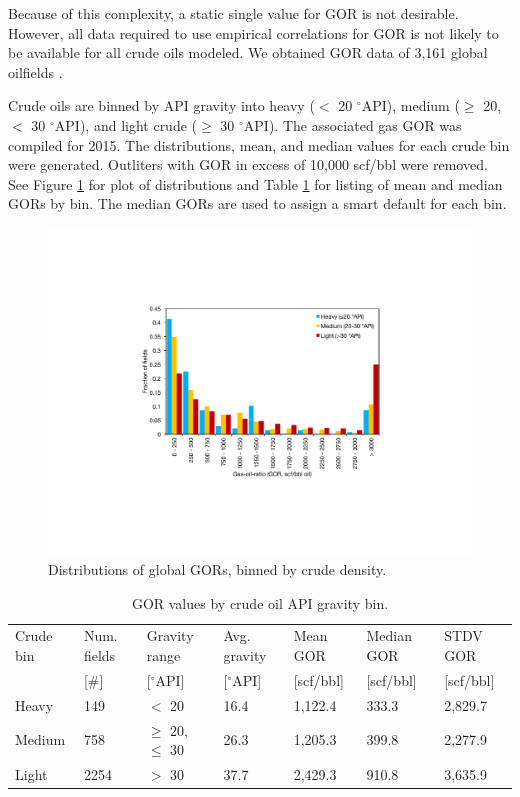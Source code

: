 \documentclass[11pt]{report}
\begin{document}
Because of this complexity, a static single value for GOR is not desirable. However, all data required to use empirical correlations for GOR is not likely to be available for all crude oils modeled. We obtained GOR data of 3,161 global oilfields \cite{masnadi2018global}. 

Crude oils are binned by API gravity into heavy ($<$ 20 $^\circ$API), medium ($\geq$ 20, $<$ 30 $^\circ$API), and light crude ($\geq$ 30 $^\circ$API). The associated gas GOR was compiled for 2015. The distributions, mean, and median values for each crude bin were generated. Outliters with GOR in excess of 10,000 scf/bbl were removed. See Figure \ref{fig:API-GOR} for plot of distributions and Table \ref{tab:GOR_averages} for listing of mean and median GORs by bin. The median GORs are used to assign a smart default for each bin. 

\begin{figure}
\includegraphics[width=0.8\columnwidth]{images/API-GOR.pdf}
\caption{Distributions of global GORs, binned by crude density.}
\label{fig:API-GOR}
\end{figure}

\begin{table}
\begin{scriptsize}
\caption{GOR values by crude oil API gravity bin.}
\label{tab:GOR_averages}
\begin{tabular*}{1\columnwidth}{p{}p{}p{}p{}p{}p{}p{}}
\toprule
Crude bin & Num. fields & Gravity range & Avg. gravity & Mean GOR & Median GOR & STDV GOR \\
& [\#] & [$^\circ$API] & [$^\circ$API] & [scf/bbl] & [scf/bbl] & [scf/bbl] \\
\midrule
Heavy & 149 & $<$ 20 & 16.4 & 1,122.4 & 333.3 & 2,829.7 \\
Medium & 758 & $\geq$ 20, $\leq$ 30 & 26.3 & 1,205.3 & 399.8 & 2,277.9 \\
Light & 2254 & $>$ 30 & 37.7 & 2,429.3 & 910.8 & 3,635.9 \\
\bottomrule
\end{tabular*}
\end{scriptsize}
\end{table}
\end{document}
